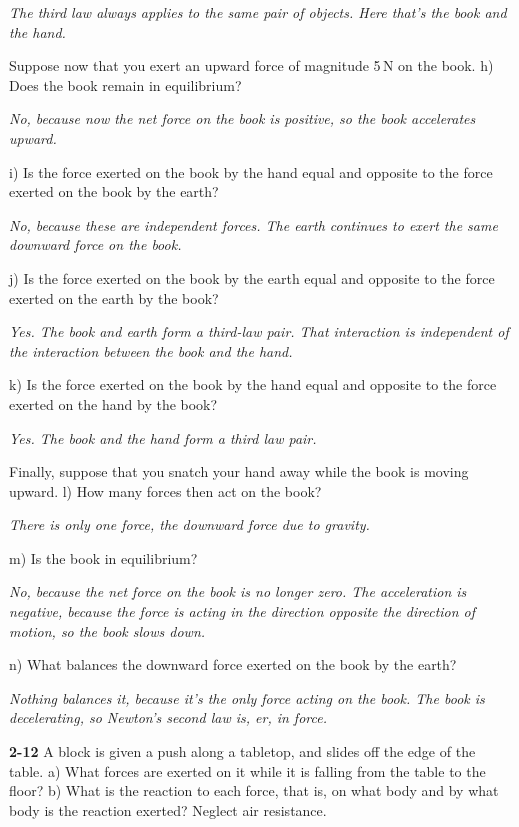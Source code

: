 \documentclass{amsart}
\begin{document}
\textit{The third law always applies to the same pair of objects.  Here that's the book and the hand.}

\vspace{\baselineskip}
\noindent
Suppose now that you exert an upward force of magnitude 5\,N on the book.\newline
h) Does the book remain in equilibrium?

\textit{No, because now the net force on the book is positive, so the book accelerates upward.}

\noindent
i) Is the force exerted on the book by the hand equal and opposite to the force exerted on the book by the earth?

\textit{No, because these are independent forces.  The earth continues to exert the same downward force on the book.}

\noindent
j) Is the force exerted on the book by the earth equal and opposite to the force exerted on the earth by the book?

\textit{Yes.  The book and earth form a third-law pair.
That interaction is independent of the interaction between the book and the hand.}

\noindent
k) Is the force exerted on the book by the hand equal and opposite to the force exerted on the hand by the book?

\textit{Yes.  The book and the hand form a third law pair.}

\vspace{\baselineskip}
\noindent
Finally, suppose that you snatch your hand away while the book is moving upward.\newline
l) How many forces then act on the book?

\textit{There is only one force, the downward force due to gravity.}

\noindent
m) Is the book in equilibrium?

\textit{No, because the net force on the book is no longer zero.  The acceleration is negative,
because the force is acting in the direction opposite the direction of motion, so the book slows down.}

\noindent
n) What balances the downward force exerted on the book by the earth?

\textit{Nothing balances it, because it's the only force acting on the book.
The book is decelerating, so Newton's second law is, er, in force.}

\vspace{\baselineskip}
\noindent
\textbf{2-12} A block is given a push along a tabletop, and slides off the edge  of the table.\newline
a) What forces are exerted on it while it is falling from the table to the floor?\newline
b) What is the reaction to each force, that is, on what body and by what body is the reaction exerted?
Neglect air resistance.
\end{document}
